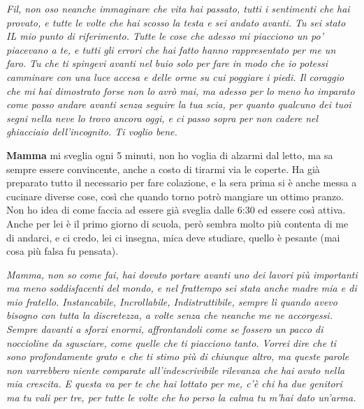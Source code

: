 \textit{Fil, non oso neanche immaginare che vita hai passato, tutti i sentimenti che hai provato, e tutte le volte che hai scosso la testa e sei andato avanti. Tu sei stato IL mio punto di riferimento. Tutte le cose che adesso mi piacciono un po' piacevano a te, e tutti gli errori che hai fatto hanno rappresentato per me un faro. Tu che ti spingevi avanti nel buio solo per fare in modo che io potessi camminare con una luce accesa e delle orme su cui poggiare i piedi. Il coraggio che mi hai dimostrato forse non lo avrò mai, ma adesso per lo meno ho imparato come posso andare avanti senza seguire la tua scia, per quanto qualcuno dei tuoi segni nella neve lo trovo ancora oggi, e ci passo sopra per non cadere nel ghiacciaio dell'incognito. Ti voglio bene.}
\vspace{5mm}

\textbf{Mamma} mi sveglia ogni 5 minuti, non ho voglia di alzarmi dal letto, ma sa sempre essere convincente, anche a costo di tirarmi via le coperte. Ha già preparato tutto il necessario per fare colazione, e la sera prima si è anche messa a cucinare diverse cose, così che quando torno potrò mangiare un ottimo pranzo. Non ho idea di come faccia ad essere già sveglia dalle 6:30 ed essere così attiva. Anche per lei è il primo giorno di scuola, però sembra molto più contenta di me di andarci, e ci credo, lei ci insegna, mica deve studiare, quello è pesante (mai cosa più falsa fu pensata).
\vspace{5mm}

\textit{Mamma, non so come fai, hai dovuto portare avanti uno dei lavori più importanti ma meno soddisfacenti del mondo, e nel frattempo sei stata anche madre mia e di mio fratello. Instancabile, Incrollabile, Indistruttibile, sempre lì quando avevo bisogno con tutta la discretezza, a volte senza che neanche me ne accorgessi. Sempre davanti a sforzi enormi, affrontandoli come se fossero un pacco di noccioline da sgusciare, come quelle che ti piacciono tanto. Vorrei dire che ti sono profondamente grato e che ti stimo più di chiunque altro, ma queste parole non varrebbero niente comparate all'indescrivibile rilevanza che hai avuto nella mia crescita. E questa va per te che hai lottato per me, c'è chi ha due genitori ma tu vali per tre, per tutte le volte che ho perso la calma tu m'hai dato un'arma.}
\vspace{5mm}

